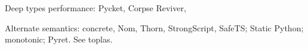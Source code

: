 

Deep types performance: Pycket, Corpse Reviver,

Alternate semantics: concrete, Nom, Thorn, StrongScript, SafeTS;
Static Python; monotonic; Pyret. See toplas.



